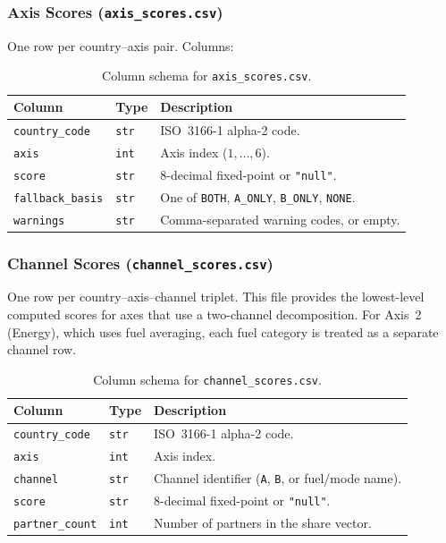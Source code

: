 \subsubsection{Axis Scores (\texttt{axis\_scores.csv})}

One row per country--axis pair.  Columns:

\begin{table}[htbp]
  \centering\small
  \caption{Column schema for \texttt{axis\_scores.csv}.}%
  \label{tab:schema-axis-scores}
  \begin{tabularx}{\textwidth}{@{}l l X@{}}
    \toprule
    \textbf{Column} & \textbf{Type} & \textbf{Description} \\
    \midrule
    \texttt{country\_code}  & \texttt{str} & ISO~3166-1 alpha-2 code. \\
    \texttt{axis}           & \texttt{int} & Axis index (\(1, \ldots, 6\)). \\
    \texttt{score}          & \texttt{str} & 8-decimal fixed-point or \texttt{"null"}. \\
    \texttt{fallback\_basis}& \texttt{str} & One of \texttt{BOTH}, \texttt{A\_ONLY},
      \texttt{B\_ONLY}, \texttt{NONE}. \\
    \texttt{warnings}       & \texttt{str} & Comma-separated warning codes, or empty. \\
    \bottomrule
  \end{tabularx}
\end{table}

\subsubsection{Channel Scores (\texttt{channel\_scores.csv})}

One row per country--axis--channel triplet.  This file provides the
lowest-level computed scores for axes that use a two-channel decomposition.
For Axis~2 (Energy), which uses fuel averaging, each fuel category is
treated as a separate channel row.

\begin{table}[htbp]
  \centering\small
  \caption{Column schema for \texttt{channel\_scores.csv}.}%
  \label{tab:schema-channel-scores}
  \begin{tabularx}{\textwidth}{@{}l l X@{}}
    \toprule
    \textbf{Column} & \textbf{Type} & \textbf{Description} \\
    \midrule
    \texttt{country\_code}  & \texttt{str} & ISO~3166-1 alpha-2 code. \\
    \texttt{axis}           & \texttt{int} & Axis index. \\
    \texttt{channel}        & \texttt{str} & Channel identifier (\texttt{A}, \texttt{B},
      or fuel/mode name). \\
    \texttt{score}          & \texttt{str} & 8-decimal fixed-point or \texttt{"null"}. \\
    \texttt{partner\_count} & \texttt{int} & Number of partners in the share vector. \\
    \bottomrule
  \end{tabularx}
\end{table}

